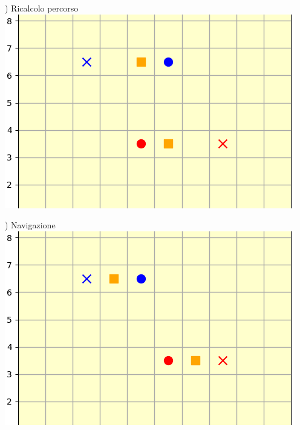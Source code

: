 \documentclass[12pt]{article}
\begin{document}
\noindent \begin{minipage}[ht]{0.45\linewidth}
) Ricalcolo percorso
\includegraphics[width=\textwidth]{SimulazioniNavigazione/2AGV_NoConflitti/2.png}
\end{minipage}
\begin{minipage}[ht]{0.45\linewidth}
) Navigazione
\includegraphics[width=\textwidth]{SimulazioniNavigazione/2AGV_NoConflitti/3.png}
\end{minipage}\\

\vspace{1cm}
\end{document}
